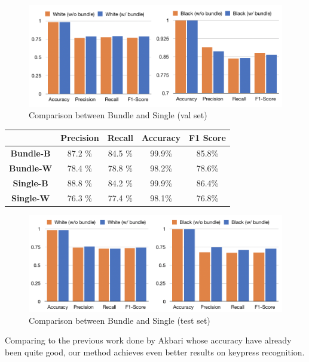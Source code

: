 \documentclass[10pt,twocolumn,letterpaper]{article}
\begin{document}
\begin{figure}[h!]
   \centering
   \includegraphics[width=\linewidth]{fig/18.png}
   \caption{Comparison between Bundle and Single (val set)}
\end{figure}

\begin{minipage}{\linewidth}
   \centering
\begin{tabular}{ccccc}
   \toprule
   & Precision &Recall&Accuracy& F1 Score\\
   \midrule
   \textbf{Bundle-B} &87.2 \%& 84.5 \%&99.9\%& 85.8\%\\
   \textbf{Bundle-W} &78.4 \%& 78.8 \%&98.2\%& 78.6\%\\
   \textbf{Single-B} &88.8 \%& 84.2 \%&99.9\%& 86.4\%\\
   \textbf{Single-W} &76.3 \%& 77.4 \%&98.1\%& 76.8\%\\
   \bottomrule
   \end{tabular}
    \label{tab:prevdataset}

\end{minipage}
\begin{figure}[h!]
   \centering
   \includegraphics[width=\linewidth]{fig/17.png}
   \caption{Comparison between Bundle and Single (test set)}
\end{figure}

Comparing to the previous work done by Akbari\cite{Akbari} whose accuracy have already been quite good, our method achieves even better results on keypress recognition.
\\
\end{document}
